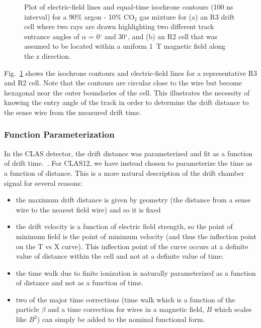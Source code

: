 \begin{figure}[htpb]
\vspace{4.5cm} 
\caption{\small{Plot of electric-field lines and equal-time isochrone contours
(100 ns interval) for a 90$\%$ argon - 10$\%$ CO$_2$ gas mixture for (a) an R3
drift cell where two rays are drawn highlighting two different track entrance 
angles of $\alpha$ = 0$^{\circ}$ and 30$^{\circ}$, and (b) an R2 cell that 
was assumed to be located within a uniform 1~T magnetic field along the z 
direction.}}
\label{garfield}
\end{figure}

Fig.~\ref{garfield} shows the isochrone contours and electric-field lines for 
a representative R3 and R2 cell.  Note that the contours are circular close 
to the wire but become hexagonal near the outer boundaries of the cell.  This 
illustrates the necessity of knowing the entry angle of the track in order to 
determine the drift distance to the sense wire from the measured drift time.

\subsubsection{Function Parameterization}
\label{funcpar} 

In the CLAS detector, the drift distance was parameterized and fit as a function
of drift time.~\cite{mdm95}.
For CLAS12, we have instead chosen to parameterize the time as a function of
distance.  This is a more natural description of the drift chamber signal
for several reasons:
\begin{itemize}
\item the maximum drift distance is given by geometry (the distance from
a sense wire to the nearest field wire) and so it is fixed
\item the drift velocity is a function of electric field strength, so the
point of minimum field is the point of minimum velocity (and thus the inflection point on the T vs X curve). 
This inflection point of the curve occurs at a
definite value of distance within the cell and not at a definite value of time.
\item the time walk due to finite ionization is
naturally parameterized as a function of distance and not as a function of time.
\item two of the major time corrections (time walk which is a function of the
particle $\beta$ and a time correction for wires in a magnetic field, $B$ which
scales like $B^2$) can simply be added to the nominal functional form.
\end{itemize}

